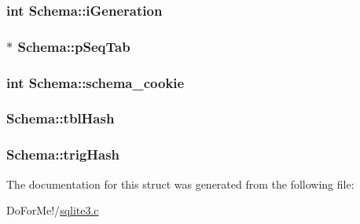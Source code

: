 \hypertarget{struct_schema_a879b1597656c7cbcbb98cdb88e876874}{
\subsubsection[{i\-Generation}]{\setlength{\rightskip}{0pt plus 5cm}int Schema\-::i\-Generation}}\label{struct_schema_a879b1597656c7cbcbb98cdb88e876874}
\hypertarget{struct_schema_ad580e4e662724bee95571d297f94da37}{
\subsubsection[{p\-Seq\-Tab}]{$\ast$ Schema\-::p\-Seq\-Tab}}\label{struct_schema_ad580e4e662724bee95571d297f94da37}
\hypertarget{struct_schema_a3eef54a64f4f962d64577646bd34a47c}{
\subsubsection[{schema\-\_\-cookie}]{\setlength{\rightskip}{0pt plus 5cm}int Schema\-::schema\-\_\-cookie}}\label{struct_schema_a3eef54a64f4f962d64577646bd34a47c}
\hypertarget{struct_schema_af841eadc93b289944b95f72b784bfaae}{
\subsubsection[{tbl\-Hash}]{ Schema\-::tbl\-Hash}}\label{struct_schema_af841eadc93b289944b95f72b784bfaae}
\hypertarget{struct_schema_ab521f4545d200329d8e1a46bbb67e7c5}{
\subsubsection[{trig\-Hash}]{ Schema\-::trig\-Hash}}\label{struct_schema_ab521f4545d200329d8e1a46bbb67e7c5}


The documentation for this struct was generated from the following file\-:\begin{DoxyCompactItemize}
\item 
Do\-For\-Me!/\hyperlink{sqlite3_8c}{sqlite3.\-c}\end{DoxyCompactItemize}
